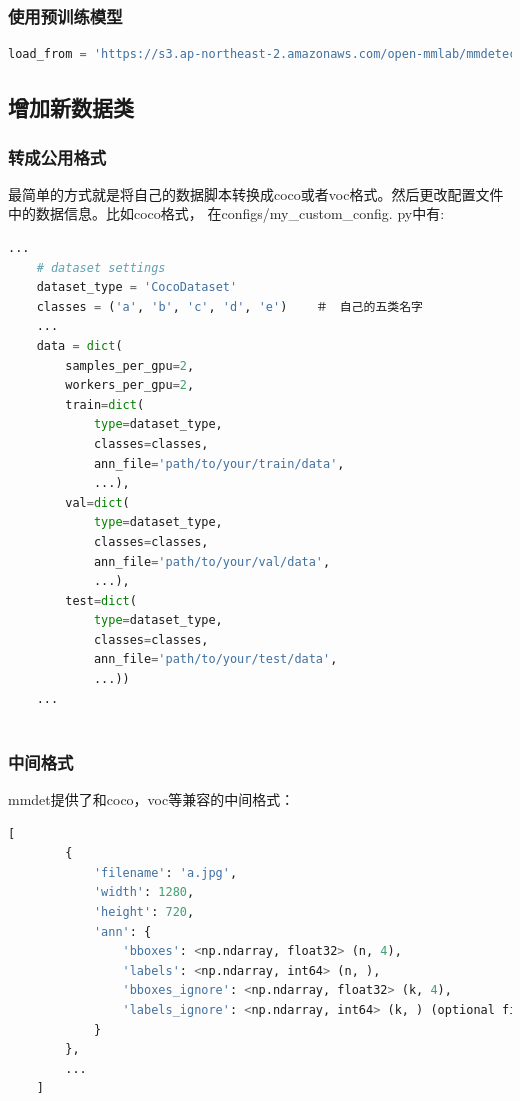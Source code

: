 \documentclass[UTF8]{ctexart}
\begin{document}
\subsubsection{使用预训练模型}

\lstset{style=mystyle}
\begin{lstlisting}[language=Python]
load_from = 'https://s3.ap-northeast-2.amazonaws.com/open-mmlab/mmdetection/models/mask_rcnn_r50_fpn_2x_20181010-41d35c05.pth' 

\end{lstlisting}


\subsection{增加新数据类}

\subsubsection{转成公用格式}
最简单的方式就是将自己的数据脚本转换成coco或者voc格式。然后更改配置文件中的数据信息。比如coco格式，
在configs/my\_custom\_config.
py中有:

\lstset{style=mystyle}
\begin{lstlisting}[language=Python]
	...
	# dataset settings
	dataset_type = 'CocoDataset'
	classes = ('a', 'b', 'c', 'd', 'e')    ＃　自己的五类名字
	...
	data = dict(
		samples_per_gpu=2,
		workers_per_gpu=2,
		train=dict(
			type=dataset_type,
			classes=classes,
			ann_file='path/to/your/train/data',
			...),
		val=dict(
			type=dataset_type,
			classes=classes,
			ann_file='path/to/your/val/data',
			...),
		test=dict(
			type=dataset_type,
			classes=classes,
			ann_file='path/to/your/test/data',
			...))
	...
	
\end{lstlisting}

\subsubsection{中间格式}
mmdet提供了和coco，voc等兼容的中间格式：
\lstset{style=mystyle}
\begin{lstlisting}[language=Python]
	[
		{
			'filename': 'a.jpg',
			'width': 1280,
			'height': 720,
			'ann': {
				'bboxes': <np.ndarray, float32> (n, 4),
				'labels': <np.ndarray, int64> (n, ),
				'bboxes_ignore': <np.ndarray, float32> (k, 4),
				'labels_ignore': <np.ndarray, int64> (k, ) (optional field)
			}
		},
		...
	]
	
\end{lstlisting}
\end{document}
